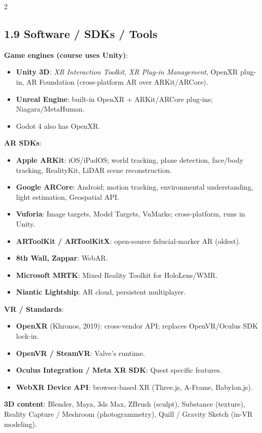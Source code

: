 \begin{paracol}{2}
\subsection*{1.9 Software / SDKs / Tools}
\textbf{Game engines (course uses Unity)}:
\begin{itemize}[leftmargin=*,nosep]
  \item \textbf{Unity 3D}: \emph{XR Interaction Toolkit}, \emph{XR Plug-in Management}, OpenXR plug-in, AR Foundation (cross-platform AR over ARKit/ARCore).
  \item \textbf{Unreal Engine}: built-in OpenXR + ARKit/ARCore plug-ins; Niagara/MetaHuman.
  \item Godot 4 also has OpenXR.
\end{itemize}
\textbf{AR SDKs}:
\begin{itemize}[leftmargin=*,nosep]
  \item \textbf{Apple ARKit}: iOS/iPadOS; world tracking, plane detection, face/body tracking, RealityKit, LiDAR scene reconstruction.
  \item \textbf{Google ARCore}: Android; motion tracking, environmental understanding, light estimation, Geospatial API.
  \item \textbf{Vuforia}: Image targets, Model Targets, VuMarks; cross-platform, runs in Unity.
  \item \textbf{ARToolKit / ARToolKitX}: open-source fiducial-marker AR (oldest).
  \item \textbf{8th Wall, Zappar}: WebAR.
  \item \textbf{Microsoft MRTK}: Mixed Reality Toolkit for HoloLens/WMR.
  \item \textbf{Niantic Lightship}: AR cloud, persistent multiplayer.
\end{itemize}
\textbf{VR / Standards}:
\begin{itemize}[leftmargin=*,nosep]
  \item \textbf{OpenXR} (Khronos, 2019): cross-vendor API; replaces OpenVR/Oculus SDK lock-in.
  \item \textbf{OpenVR / SteamVR}: Valve's runtime.
  \item \textbf{Oculus Integration / Meta XR SDK}: Quest specific features.
  \item \textbf{WebXR Device API}: browser-based XR (Three.js, A-Frame, Babylon.js).
\end{itemize}
\textbf{3D content}: Blender, Maya, 3ds Max, ZBrush (sculpt), Substance (texture), Reality Capture / Meshroom (photogrammetry), Quill / Gravity Sketch (in-VR modeling).


\end{paracol}
